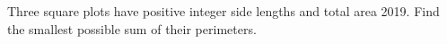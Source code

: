 Three square plots have positive integer side lengths and total area 2019. Find the smallest possible sum of their perimeters.
